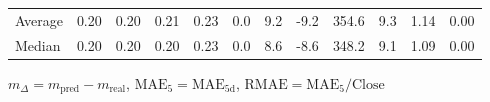 \begin{threeparttable}
{\begin{tabular}{lrrrrrrrrrrr}
Average &          0.20 &          0.20 &          0.21 &        0.23 &                 0.0 &                 9.2 &       -9.2 &               354.6 &              9.3 &            1.14 &                   0.00 \\
 Median &          0.20 &          0.20 &          0.20 &        0.23 &                 0.0 &                 8.6 &       -8.6 &               348.2 &              9.1 &            1.09 &                   0.00 \\
\bottomrule
\end{tabular}
}
\begin{tablenotes}\footnotesize
\item $m_\Delta=m_{\text{pred}}-m_{\text{real}}$,
$\mathrm{MAE}_5=\mathrm{MAE}_{5\text{d}}$,
$\mathrm{RMAE}=\mathrm{MAE}_5/\text{Close}$
\end{tablenotes}
\end{threeparttable}
\endgroup

